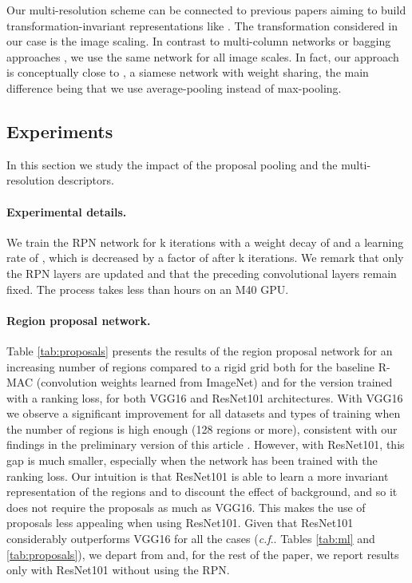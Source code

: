 \documentclass[twocolumn]{svjour3}          \smartqed  \usepackage{graphicx}
\makeatletter
\DeclareRobustCommand\onedot{\futurelet\@let@token\@onedot}
\def\@onedot{\ifx\@let@token.\else.\null\fi\xspace}
\def\cf{\emph{c.f}\onedot} \def\Cf{\emph{C.f}\onedot}
\makeatother
\begin{document}
Our multi-resolution scheme can be connected to previous papers aiming to build transformation-invariant representations like \cite{a,b}. The transformation considered in our case is the image scaling. In contrast to multi-column networks or bagging approaches \citep{a}, we use the same network for all image scales. In fact, our approach is conceptually close to \cite{b}, a siamese network with weight sharing, the main difference being that we use average-pooling instead of max-pooling.



\subsection{Experiments}

In this section we study the impact of the proposal pooling and the multi-resolution descriptors.

\paragraph{Experimental details.}
We train the RPN network for k iterations with a weight decay of  and a learning rate of , which is decreased by a factor of  after k iterations.
We remark that only the RPN layers are updated and that the preceding convolutional layers remain fixed. 
The process takes less than  hours on an M40 GPU.

\paragraph{Region proposal network.}

Table \ref{tab:proposals} presents the results of the region proposal network for an increasing number of regions compared to a rigid grid both for the baseline R-MAC (convolution weights learned from ImageNet) and for the version trained with a ranking loss, for both VGG16 and ResNet101 architectures.
With VGG16 we observe a significant improvement for all datasets and types of training when the number of regions is high enough (128 regions or more), consistent with our findings in the preliminary version of this article \citep{gordo2016deep}. 
However, with ResNet101, this gap is much smaller, especially when the network has been trained with the ranking loss.
Our intuition is that ResNet101 is able to learn a more invariant representation of the regions and to discount the effect of background, and so it does not require the proposals as much as VGG16. This makes the use of proposals less appealing when using ResNet101.
Given that ResNet101 considerably outperforms VGG16 for all the cases (\cf Tables \ref{tab:ml} and \ref{tab:proposals}), we depart from \cite{gordo2016deep} and, for the rest of the paper, we report results only with ResNet101 without using the RPN.
\end{document}
